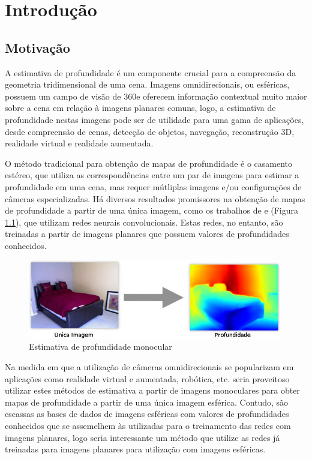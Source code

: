 \documentclass[cic,tc]{iiufrgs}
\begin{document}
\tableofcontents


\chapter{Introdução}

\section{Motivação}

A estimativa de profundidade é um componente crucial para a compreensão da geometria tridimensional de uma cena. Imagens omnidirecionais, ou esféricas, possuem um campo de visão de 360\degree e oferecem informação contextual muito maior sobre a cena em relação à imagens planares comuns, logo, a estimativa de profundidade nestas imagens pode ser de utilidade para uma gama de aplicações, desde compreensão de cenas, detecção de objetos, navegação, reconstrução 3D, realidade virtual e realidade aumentada.

O método tradicional para obtenção de mapas de profundidade é o casamento estéreo, que utiliza as correspondências entre um par de imagens para estimar a profundidade em uma cena, mas requer mútliplas imagens e/ou configurações de câmeras especializadas. Há diversos resultados promissores na obtenção de mapas de profundidade a partir de uma única imagem, como os trabalhos de  \citet{Eigen2015} e \citet{Fayao2015} (Figura \ref{fig:monoDepth}), que utilizam redes neurais convolucionais. Estas redes, no entanto, são treinadas a partir de imagens planares que possuem valores de profundidades conhecidos.
\begin{figure}
    \caption{Estimativa de profundidade monocular}
    \begin{center}
        \includegraphics[width=30em]{monocular-depth.jpg}
    \end{center}
    \label{fig:monoDepth}
\end{figure}
Na medida em que a utilização de câmeras omnidirecionais se popularizam em aplicações como realidade virtual e aumentada, robótica, etc. seria proveitoso utilizar estes métodos de estimativa a partir de imagens monoculares para obter mapas de profundidade a partir de uma única imagem esférica. Contudo, são escassas as bases de dados de imagens esféricas com valores de profundidades conhecidos que se assemelhem às utilizadas para o treinamento das redes com imagens planares, logo seria interessante um método que utilize as redes já treinadas para imagens planares para utilização com imagens esféricas.
\end{document}
